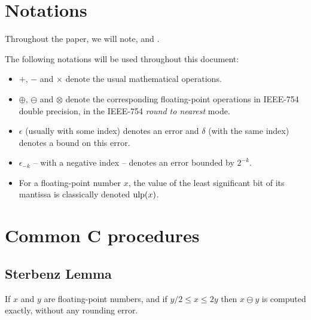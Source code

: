 
\section{Notations\label{section:notations}}

Throughout the paper, we will note, and  .





The following notations will be used throughout this document:
\begin{itemize}

\item  $+$, $-$ and  $\times$ denote the usual
mathematical operations.

\item $\oplus$, $\ominus$ and $\otimes$ denote the
corresponding floating-point operations in IEEE-754 double precision,
in the IEEE-754 \emph{round to nearest} mode.

\item $\epsilon$ (usually with some index) denotes an error and
  $\delta$ (with the same index) denotes a bound on this error.

\item $\epsilon_{-k}$ -- with a negative index -- denotes an error bounded by $2^{-k}$.
  
\item For a floating-point number $x$, the value of the least
  significant bit of its mantissa is classically denoted $\mbox{ulp}(x)$.

\end{itemize}




\section{Common C procedures \label{section:commonC}}

\subsection{Sterbenz Lemma}

\begin{theorem}
\label{sterbenz}
If $x$ and $y$ are floating-point numbers, and if ${y}/{2} \leq x \leq 2y$ then $x\ominus y$ is computed exactly, without any rounding error.
\end{theorem}


